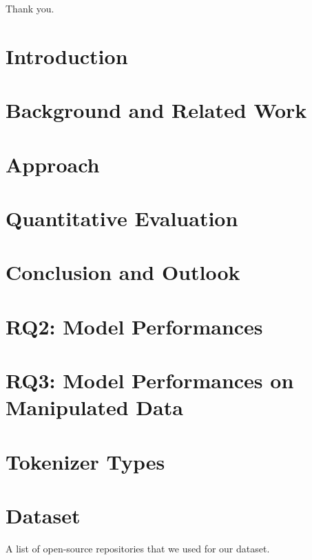 \documentclass[
     12pt,                    %
     a4paper,             %
     BCOR10mm,     %
     DIV14,                 %
     listof=totoc,                    %
     bibliography=totoc,       %
     index=totoc,              %
     twoside,
     headsepline
     ]{scrreprt}
\begin{document}
Thank you.

\cleardoublepage

\tableofcontents
\cleardoublepage
{} 

\cleardoublepage


\chapter{Introduction}\label{chap:intro}


\chapter{Background and Related Work}\label{chap:background}


\chapter{Approach}\label{chap:approach}


\chapter{Quantitative Evaluation}\label{chap:evaluation}


\chapter{Conclusion and Outlook}\label{chap:conclusion}

  

\clearpage





\appendix
\appendixpage
\addappheadtotoc
\setcounter{table}{0}
\renewcommand{\thetable}{A\arabic{table}}




\chapter*{RQ2: Model Performances}

\chapter*{RQ3: Model Performances on Manipulated Data}

\chapter*{Tokenizer Types}

\chapter*{Dataset}
\begin{table}[h]
     \footnotesize
     \caption{A list of open-source repositories that we used for our dataset.}
     \label{tab:repos_hashes}
\end{table}
\end{document}
